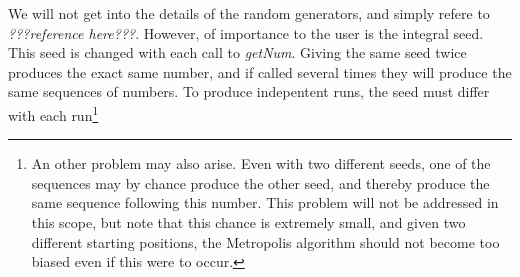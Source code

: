 We will not get into the details of the random generators, and simply
refere to \emph{???reference here???}. However, of importance to the
user is the integral seed. This seed is changed with each call to
\emph{getNum}. Giving the same seed twice produces the exact same
number, and if called several times they will produce the same
sequences of numbers. To produce indepentent runs, the seed
must differ with each run\footnote{An other problem may also
  arise. Even with two different seeds, one of the sequences may by
  chance produce the other seed, and thereby produce the same sequence
following this number. This problem will not be addressed in this
scope, but note that this chance is extremely small, and given two
different starting positions, the Metropolis algorithm should not
become too biased even if this were to occur.}










































